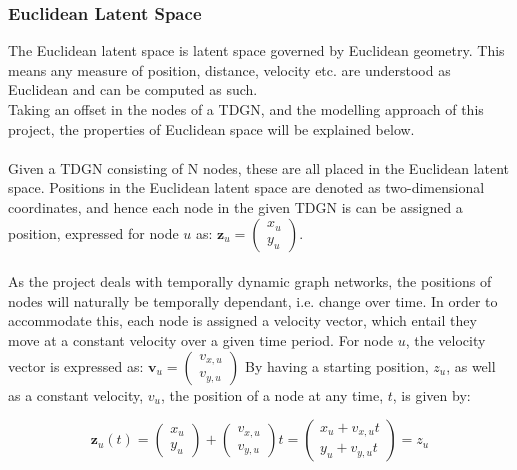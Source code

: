 \subsubsection{Euclidean Latent Space}
\label{sec:Method:LSM:EuclideanLatentSpace}
The Euclidean latent space is latent space governed by Euclidean geometry.
This means any measure of position, distance, velocity etc. are understood as Euclidean and can be computed as such. 
\\
Taking an offset in the nodes of a TDGN, and the modelling approach of this project, the properties of Euclidean space will be explained below.
\\\\
Given a TDGN consisting of N nodes, these are all placed in the Euclidean latent space. 
Positions in the Euclidean latent space are denoted as two-dimensional coordinates, and hence each node in the given TDGN is can be assigned a position, expressed for node $u$ as:
$\textbf{z}_u = \begin{pmatrix}
x_u\\
y_u
\end{pmatrix}$.
\\\\
As the project deals with temporally dynamic graph networks, the positions of nodes will naturally be temporally dependant, i.e. change over time. 
In order to accommodate this, each node is assigned a velocity vector, which entail they move at a constant velocity over a given time period.
For node $u$, the velocity vector is expressed as:
$\textbf{v}_u = \begin{pmatrix}
v_{x,u}\\
v_{y,u}
\end{pmatrix}$
By having a starting position, $z_u$, as well as a constant velocity, $v_u$, the position of a node at any time, $t$, is given by: 

\begin{equation}
    \textbf{z}_u(t) = \begin{pmatrix}
    x_u\\
    y_u
    \end{pmatrix}
    +
    \begin{pmatrix}
    v_{x,u}\\
    v_{y,u}
    \end{pmatrix}
    t
    = 
    \begin{pmatrix}
    x_u + v_{x,u}t\\
    y_u + v_{y,u}t
    \end{pmatrix}
    =
    z_u
\end{equation}

